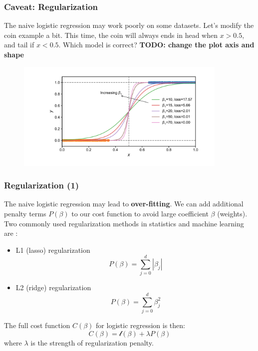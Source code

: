\documentclass[10pt,aspectratio=169]{beamer}
\begin{document}
      \begin{frame}
        \frametitle{Caveat: Regularization}
        
        The naive logistic regression may work poorly on some
        datasets.  Let's modify the coin example a bit. This time, the
        coin will always ends in head when $x > 0.5$, and tail if
        $x < 0.5$. Which model is correct?  \textbf{TODO: change the
          plot axis and shape}

        \begin{figure}[t]
          \vspace{-1em}
          \includegraphics[width=0.90\textwidth]{scripts/perfect_sep.pdf}
        \end{figure}
        
      \end{frame}

      \begin{frame}
        \frametitle{Regularization (1)}

        The naive logistic regression may lead to
        \textbf{over-fitting}.  We can add additional penalty terms
        $P(\beta)$ to our cost function to avoid large coefficient
        $\beta$ (weights). Two commonly used regularization methods in
        statistics and machine learning are
        \let\thefootnote\relax{}:

        \begin{itemize}
        \item L1 (lasso) regularization
          \begin{equation*}
            P(\beta) = \sum_{j=0}^{d} |\beta_{j}| 
          \end{equation*}

          
        \item L2 (ridge) regularization
          \begin{equation*}
            P(\beta) = \sum_{j=0}^{d} \beta_{j}^{2}
          \end{equation*}
        \end{itemize}

        The full cost function $C(\beta)$ for logistic regression is
        then:
        \begin{equation*}
          C(\beta) = \mathscr{l}(\beta) + \lambda P(\beta)
        \end{equation*}
        where $\lambda$ is the strength of regularization penalty.
      \end{frame}
\end{document}
